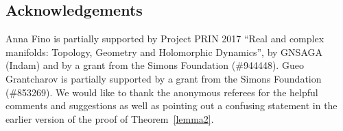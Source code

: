 \documentclass[10pt,a4paper]{amsart}
\numberwithin{equation}{section}
\begin{document}
\subsection*{Acknowledgements}

Anna Fino is partially supported by Project PRIN 2017 ``Real and complex manifolds: Topology, Geometry and Holomorphic Dynamics'', by GNSAGA (Indam) and by a grant from the Simons Foundation (\#944448). Gueo
Grantcharov is partially supported by a grant from the Simons
Foundation (\#853269). We would like to thank the anonymous referees for the helpful comments and suggestions as well as pointing out a confusing statement in the earlier version of the proof of Theorem~\ref{lemma2}.


\end{document}
